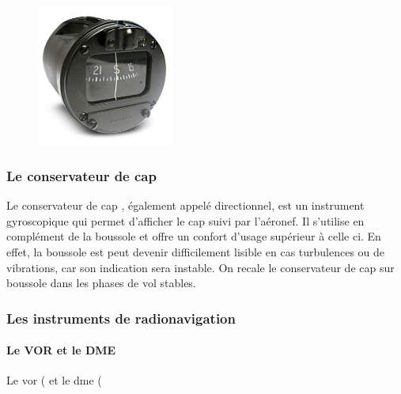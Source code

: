 	\begin{figure}[H]
  	\centering
    \includegraphics[width=0.4\textwidth]{01-EtudeAeronefs/img/compas.jpg}
	\end{figure}	
	
	\subsubsection{Le conservateur de cap}
	
	Le \gls{conservateur de cap} , également appelé directionnel, est un instrument gyroscopique qui permet d'afficher le cap suivi par l'aéronef. Il s'utilise en complément de la boussole et offre un confort d'usage supérieur à celle ci. En effet, la boussole est peut devenir difficilement lisible en cas turbulences ou de vibrations, car son indication sera instable. On recale le conservateur de cap sur boussole dans les phases de vol stables.
	
	\begin{figure}[H]	
	\centering
	\end{figure}
	
	\subsubsection{Les instruments de radionavigation}
	
	\paragraph{Le VOR et le DME}
	Le \acrshort{vor} ( et le \acrshort{dme} (
	
